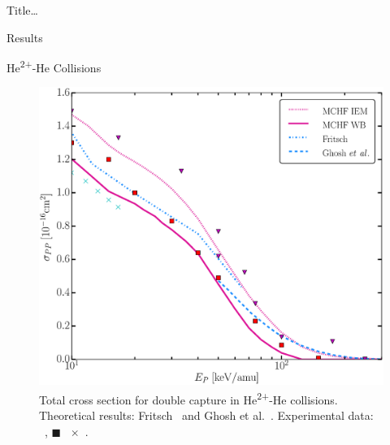 \documentclass[letterpaper, 10 pt]{report}
\begin{document}
\begin{chapter}{ Title\dots \label{chap:p-he2p-he}}
\begin{section}{Results \label{sec:phe2p-res}}
\begin{subsection}{\texorpdfstring{He\textsuperscript{2+}}{He2+}-He Collisions 
                         \label{sec:he2phe-res}}
         \begin{figure}[htp]
            \centering
            \includegraphics[width = 0.49\linewidth]{./images/he2phe/he2phe-PP.eps}
            \caption[Total cross section for double capture in He\textsuperscript{2+}-He
                     collisions.]{Total cross section for double capture in He\textsuperscript{2+}-He
                     collisions.
                     Theoretical results: Fritsch~\cite{Fritsch-94} and Ghosh
                     et al.~\cite{GDMP-08}.
                     Experimental data: {\color{RedViolet}{$\blacktriangledown$}}~\cite{Dubois87},
                     {\color{red}$\blacksquare$}~\cite{Rudd85}
                     {\color{TealBlue}$\times$}~\cite{SG74}. \label{fig:he2phe-pp}}
         \end{figure}


\end{subsection}
\end{section}
\end{chapter}
\end{document}
